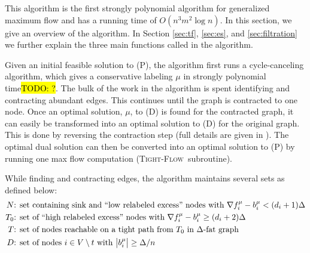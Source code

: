 \documentclass[11pt]{article}
\theoremstyle{definition}
\theoremstyle{definition}
\newcommand{\fu}{f^{\mu}}
\newcommand{\nfiu}{\nabla \fu_i}
\newcommand{\biu}{b_{i}^{\mu}}
\newcommand{\tf}{\textsc{Tight-Flow}}
\newcommand{\todo}[1]{\hl{TODO: #1}}
\begin{document}
   This algorithm is the first strongly polynomial algorithm for generalized maximum flow and has a running time of $O(n^3 m^2 \log n)$. In this section, we give an overview of the algorithm. In Section \ref{sec:tf}, \ref{sec:es}, and \ref{sec:filtration} we further explain the three main functions called in the algorithm. %
	     
	Given an initial feasible solution to (P), the algorithm first runs a cycle-canceling algorithm,
		which gives a conservative labeling $\mu$ in strongly polynomial
		time\todo{?}. The bulk of the
    work in the algorithm is spent identifying and contracting abundant edges. This continues
    until the graph is contracted to one node. Once an optimal solution, $\mu$, to (D)
    is found for the contracted graph, it can easily be transformed into an optimal solution to
    (D) for the original graph. This is done by reversing the contraction step (full details
    are given in \cite{article}). The optimal dual solution can then be converted into an optimal solution to (P) by running one max flow computation (\tf\ subroutine). %
	
	While finding and contracting edges, the algorithm maintains several sets as defined below:
	\begin{align*}
	N&\text{: set containing sink and ``low relabeled excess'' nodes with }
            \nfiu - \biu < (d_i +1)\Delta \\
	T_0&\text{: set of ``high relabeled excess'' nodes with } \nfiu - \biu \geq (d_i + 2)\Delta \\
	T&\text{: set of nodes reachable on a tight path from $T_0$ in $\Delta$-fat graph} \\ 
	D&\text{: set of nodes $i \in V \setminus t$ with } \abs{b_i^\mu} \geq \Delta / n
	\end{align*}
	
\end{document}
